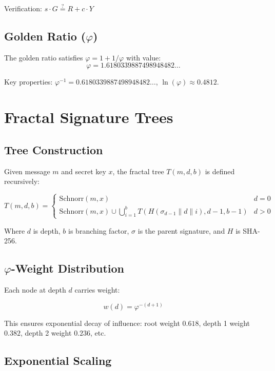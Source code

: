 \documentclass{article}
\begin{document}
Verification: $s \cdot G \stackrel{?}{=} R + c \cdot Y$

\subsection{Golden Ratio ($\varphi$)}

The golden ratio satisfies $\varphi = 1 + 1/\varphi$ with value:
\begin{equation}
\varphi = 1.6180339887498948482\ldots
\end{equation}

Key properties: $\varphi^{-1} = 0.6180339887498948482\ldots$, $\ln(\varphi) \approx 0.4812$.

\section{Fractal Signature Trees}

\subsection{Tree Construction}

Given message $m$ and secret key $x$, the fractal tree $T(m, d, b)$ is defined recursively:

\begin{equation}
T(m, d, b) = \begin{cases}
\text{Schnorr}(m, x) & d = 0\\
\text{Schnorr}(m, x) \cup \bigcup_{i=1}^{b} T(H(\sigma_{d-1} \parallel d \parallel i), d-1, b-1) & d > 0
\end{cases}
\end{equation}

Where $d$ is depth, $b$ is branching factor, $\sigma$ is the parent signature, and $H$ is SHA-256.

\subsection{$\varphi$-Weight Distribution}

Each node at depth $d$ carries weight:

\begin{equation}
w(d) = \varphi^{-(d+1)}
\end{equation}

This ensures exponential decay of influence: root weight $0.618$, depth 1 weight $0.382$, depth 2 weight $0.236$, etc.

\subsection{Exponential Scaling}
\end{document}
